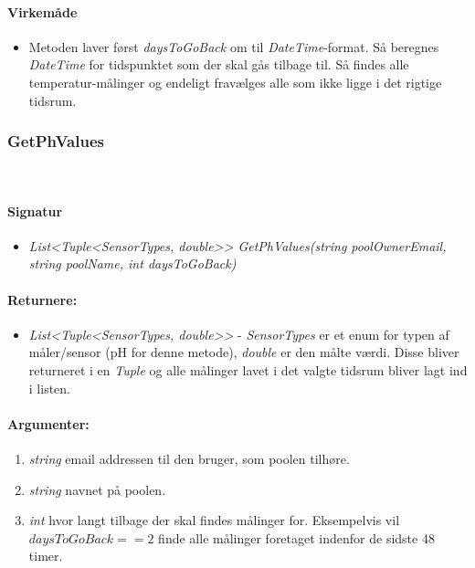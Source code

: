\paragraph{Virkemåde}
\begin{itemize}
	\item Metoden laver først \textit{daysToGoBack} om til \textit{DateTime}-format. Så beregnes \textit{DateTime} for tidspunktet som der skal gås tilbage til. Så findes alle temperatur-målinger og endeligt fravælges alle som ikke ligge i det rigtige tidsrum.
\end{itemize}







\subsubsection{GetPhValues}\ %









\paragraph{Signatur}
\begin{itemize}
	\item \textit{List<Tuple<SensorTypes, double>> GetPhValues(string poolOwnerEmail, string poolName, int daysToGoBack)}
\end{itemize}

\paragraph{Returnere:}
\begin{itemize}
	\item \textit{List<Tuple<SensorTypes, double>>} - \textit{SensorTypes} er et enum for typen af måler/sensor (pH for denne metode), \textit{double} er den målte værdi. Disse bliver returneret i en \textit{Tuple} og alle målinger lavet i det valgte tidsrum bliver lagt ind i listen.
\end{itemize}

\paragraph{Argumenter:}
\begin{enumerate}
	\item \textit{string} email addressen til den bruger, som poolen tilhøre.
	\item \textit{string} navnet på poolen.
	\item \textit{int} hvor langt tilbage der skal findes målinger for. Eksempelvis vil $daysToGoBack == 2$ finde alle målinger foretaget indenfor de sidste 48 timer.
\end{enumerate}

